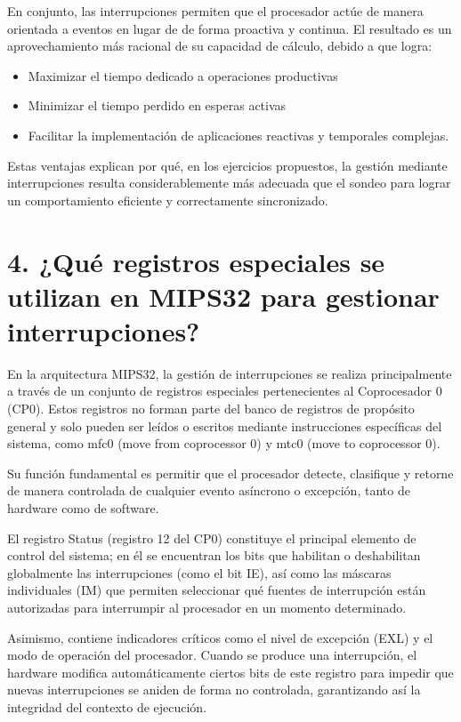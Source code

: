 \documentclass[12pt, letterpaper]{article}
\begin{document}
 En conjunto, las interrupciones permiten que el procesador actúe de manera orientada a eventos en lugar de de forma proactiva y continua. El resultado es un aprovechamiento más racional de su capacidad de cálculo, debido a que logra:

\begin{itemize}
    \item Maximizar el tiempo dedicado a operaciones productivas
    \item Minimizar el tiempo perdido en esperas activas
    \item Facilitar la implementación de aplicaciones reactivas y temporales complejas.
\end{itemize}

Estas ventajas explican por qué, en los ejercicios propuestos, la gestión mediante interrupciones resulta considerablemente más adecuada que el sondeo para lograr un comportamiento eficiente y correctamente sincronizado.\newpage

\section*{\textbf{\textbf{4. ¿Qué registros especiales se utilizan en MIPS32 para gestionar interrupciones?} }}

En la arquitectura MIPS32, la gestión de interrupciones se realiza principalmente a través de un conjunto de registros especiales pertenecientes al Coprocesador 0 (CP0). Estos registros no forman parte del banco de registros de propósito general y solo pueden ser leídos o escritos mediante instrucciones específicas del sistema, como mfc0 (move from coprocessor 0) y mtc0 (move to coprocessor 0). 

Su función fundamental es permitir que el procesador detecte, clasifique y retorne de manera controlada de cualquier evento asíncrono o excepción, tanto de hardware como de software.

El registro Status (registro 12 del CP0) constituye el principal elemento de control del sistema; en él se encuentran los bits que habilitan o deshabilitan globalmente las interrupciones (como el bit IE), así como las máscaras individuales (IM) que permiten seleccionar qué fuentes de interrupción están autorizadas para interrumpir al procesador en un momento determinado. 

Asimismo, contiene indicadores críticos como el nivel de excepción (EXL) y el modo de operación del procesador. Cuando se produce una interrupción, el hardware modifica automáticamente ciertos bits de este registro para impedir que nuevas interrupciones se aniden de forma no controlada, garantizando así la integridad del contexto de ejecución.
\end{document}
